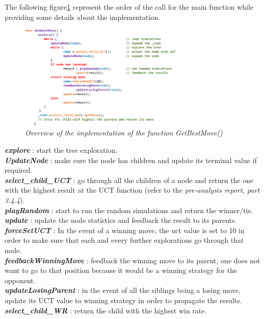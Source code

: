 The following figure\ref{fig:MCTSAlgorithm} represent the order of the call for the main function while providing some details about the implementation.
\begin{figure}[H]
\centerline{\includegraphics[width=0.7\textwidth]{Base_Algorithm/Img/Algorithm.png}}
\caption{\label{fig:MCTSAlgorithm}\textit{Overview of the implementation of the function GetBestMove()}}
\end{figure}
\noindent
\textit{\textbf{explore}} : start the tree exploration.
\medskip\\
\textit{\textbf{UpdateNode}} : make sure the node has children and update its terminal value if required.
\medskip\\
\textit{\textbf{select\_child\_UCT}} : go through all the children of a node and return the one with the highest result at the UCT function (refer to the \textit{pre-analysis report, part 3.4.4}).
\medskip\\
\textit{\textbf{playRandom}} : start to run the random simulations and return the winner/tie.
\medskip\\
\textit{\textbf{update}} : update the node statistics and feedback the result to its parents.
\medskip\\
\textit{\textbf{forceSetUCT}} : In the event of a winning move, the uct value is set to 10 in order to make sure that each and every further explorations go through that node.
\medskip\\
\textit{\textbf{feedbackWinningMove}} : feedback the winning move to its parent, one does not want to go to that position because it would be a winning strategy for the opponent.
\medskip\\
\textit{\textbf{updateLosingParent}} : in the event of all the siblings being a losing move, update its UCT value to winning strategy in order to propagate the results.
\medskip\\
\textit{\textbf{select\_child\_WR}} : return the child with the highest win rate.\\
